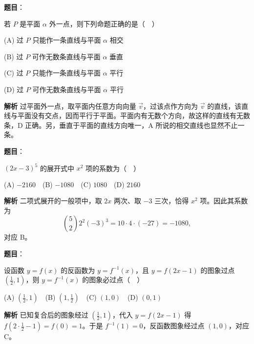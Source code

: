 \begin{answer}

\textbf{题目}：

若 \(P\) 是平面 \(\alpha\) 外一点，则下列命题正确的是（　）

(A) 过 \(P\) 只能作一条直线与平面 \(\alpha\) 相交

(B) 过 \(P\) 可作无数条直线与平面 \(\alpha\) 垂直

(C) 过 \(P\) 只能作一条直线与平面 \(\alpha\) 平行

(D) 过 \(P\) 可作无数条直线与平面 \(\alpha\) 平行

\textbf{解析}
过平面外一点，取平面内任意方向向量 \(\vec v\)，过该点作方向为 \(\vec v\) 的直线，该直线与平面没有交点，因而平行于平面。平面内有无数个方向，故这样的直线有无数条，D 正确。另，垂直于平面的直线方向唯一，A 所说的相交直线也显然不止一条。


\end{answer}
\begin{answer}

\textbf{题目}：

\((2x-3)^5\) 的展开式中 \(x^2\) 项的系数为（　）

(A) \(-2160\)　(B) \(-1080\)　(C) \(1080\)　(D) \(2160\)

\textbf{解析}
二项式展开的一般项中，取 \(2x\) 两次、取 \(-3\) 三次，恰得 \(x^2\) 项。因此其系数为
\nopagebreak[4]
\[
\binom52 2^2(-3)^3=10\cdot4\cdot(-27)=-1080,
\]
对应 B。


\end{answer}
\begin{answer}

\textbf{题目}：

设函数 \(y=f(x)\) 的反函数为 \(y=f^{-1}(x)\)，且 \(y=f(2x-1)\) 的图象过点 \(\left(\frac12,1\right)\)，则 \(y=f^{-1}(x)\) 的图象必过点（　）

(A) \(\left(\frac12,1\right)\)　(B) \(\left(1,\frac12\right)\)　(C) \((1,0)\)　(D) \((0,1)\)

\textbf{解析}
已知复合后的图象经过 \((\tfrac12,1)\)，代入 \(y=f(2x-1)\) 得 \(f(2\cdot\tfrac12-1)=f(0)=1\)。于是 \(f^{-1}(1)=0\)，反函数图象经过点 \((1,0)\)，对应 C。


\end{answer}
